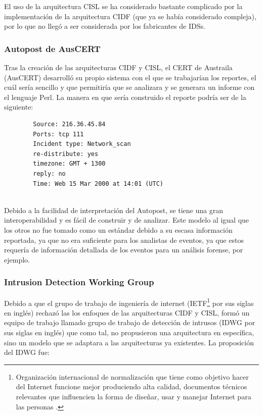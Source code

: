 	El uso de la arquitectura CISL se ha considerado bastante complicado por la implementación de la arquitectura CIDF (que ya se había considerado compleja), por lo que no llegó a ser considerada por los fabricantes de IDSs.\\
	
	
	\subsubsection{Autopost de AusCERT}
	
	Tras la creación de las arquitecturas CIDF y CISL, el CERT de Austraila (AusCERT) desarrolló su propio sistema con el que se trabajarían los reportes, el cuál sería sencillo y que permitiría que se analizara y se generara un informe con el lenguaje Perl. La manera en que sería construido el reporte podría ser de la siguiente: \\ 
	
	\begin{lstlisting}
		Source: 216.36.45.84
		Ports: tcp 111
		Incident type: Network_scan
		re-distribute: yes
		timezone: GMT + 1300
		reply: no
		Time: Web 15 Mar 2000 at 14:01 (UTC) 
		
	\end{lstlisting}
	
	
	Debido a la facilidad de interpretación del Autopost, se tiene una gran interoperabilidad y es fácil de construir y de analizar. Este modelo al igual que los otros no fue tomado como un estándar debido a su escasa información reportada, ya que no era suficiente para los analistas de eventos, ya que estos requería de información detallada de los eventos para un análisis forense, por ejemplo.\\
	
	
	\subsubsection{Intrusion Detection Working Group}
	
	Debido a que el grupo de trabajo de ingeniería de internet (IETF\footnote{Organización internacional de normalización que tiene como objetivo hacer del Internet funcione mejor produciendo alta calidad, documentos técnicos relevantes que influencien la forma de diseñar, usar y manejar Internet para las personas \cite{IEFT}.} por sus siglas en inglés) rechazó las los enfoques de las arquitecturas CIDF y CISL, formó un equipo de trabajo llamado grupo de trabajo de detección de intrusos (IDWG por sus siglas en inglés) que como tal, no propusieron una arquitectura en específica, sino un modelo que se adaptara a las arquitecturas ya existentes. La proposición del IDWG fue: \\
	
